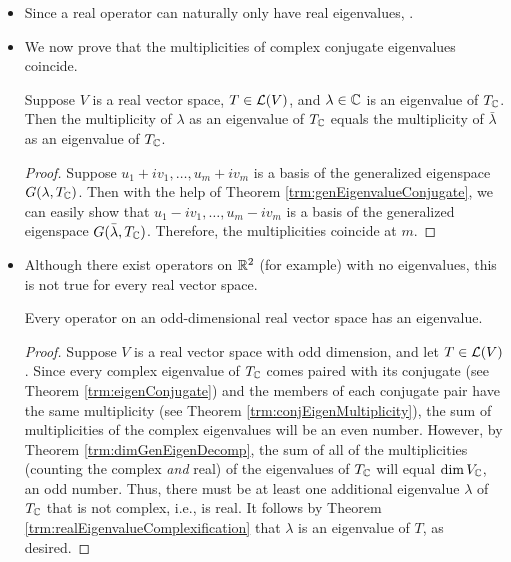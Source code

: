\documentclass[../main.tex]{subfiles}
\begin{document}
\begin{itemize}
\begin{theorem}
        Suppose $V$ is a real vector space, $T\in\ope{V}$, and $\lambda\in\C$. Then $\lambda$ is an eigenvalue of $T_\C$ if and only if $\bar{\lambda}$ is an eigenvalue of $T_\C$.
        \begin{proof}
            Take $j=1$ in Theorem \ref{trm:genEigenvalueConjugate}.
        \end{proof}
    \end{theorem}
    \item Since a real operator can naturally only have real eigenvalues, .
    \item We now prove that the multiplicities of complex conjugate eigenvalues coincide.
    \begin{theorem}\label{trm:conjEigenMultiplicity}
        Suppose $V$ is a real vector space, $T\in\ope{V}$, and $\lambda\in\C$ is an eigenvalue of $T_\C$. Then the multiplicity of $\lambda$ as an eigenvalue of $T_\C$ equals the multiplicity of $\bar{\lambda}$ as an eigenvalue of $T_\C$.
        \begin{proof}
            Suppose $u_1+iv_1,\dots,u_m+iv_m$ is a basis of the generalized eigenspace $G(\lambda,T_{\mathbb{C}})$. Then with the help of Theorem \ref{trm:genEigenvalueConjugate}, we can easily show that $u_1-iv_1,\dots,u_m-iv_m$ is a basis of the generalized eigenspace $G(\bar{\lambda},T_{\mathbb{C}})$. Therefore, the multiplicities coincide at $m$.
        \end{proof}
    \end{theorem}
    \item Although there exist operators on $\mathbb{R}^2$ (for example) with no eigenvalues, this is not true for every real vector space.
    \begin{theorem}
        Every operator on an odd-dimensional real vector space has an eigenvalue.
        \begin{proof}
            Suppose $V$ is a real vector space with odd dimension, and let $T\in\ope{V}$. Since every complex eigenvalue of $T_\C$ comes paired with its conjugate (see Theorem \ref{trm:eigenConjugate}) and the members of each conjugate pair have the same multiplicity (see Theorem \ref{trm:conjEigenMultiplicity}), the sum of multiplicities of the complex eigenvalues will be an even number. However, by Theorem \ref{trm:dimGenEigenDecomp}, the sum of all of the multiplicities (counting the complex \emph{and} real) of the eigenvalues of $T_\C$ will equal $\dim V_{\mathbb{C}}$, an odd number. Thus, there must be at least one additional eigenvalue $\lambda$ of $T_\C$ that is not complex, i.e., is real. It follows by Theorem \ref{trm:realEigenvalueComplexification} that $\lambda$ is an eigenvalue of $T$, as desired.

\end{proof}
\end{theorem}
\end{itemize}
\end{document}

